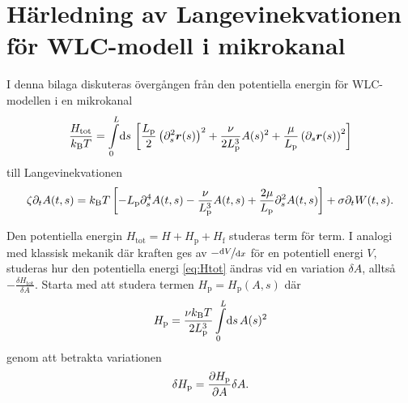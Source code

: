 \chapter{Härledning av Langevinekvationen för WLC-modell i mikrokanal}
\label{A5}

I denna bilaga diskuteras övergången från den potentiella energin för WLC-modellen i en mikrokanal 
\begin{equation}\label{eq:Htot}
    \frac{H_\text{tot}}{\kbT}=\int_{0}^{L}\!\dd{s}\,\left[\frac{L_\text{p}}{2}\left(\partial_{s}^{2}\mathbf{r}(s)\right)^2 + \frac{\nu}{2L_\text{p}^3} A(s)^2 + \frac{\mu}{L_\text{p}}\left(\pd_{s}\mathbf{r}(s)\right)^{2} \right]
\end{equation}
till Langevinekvationen 
\begin{equation}\label{eq:wlclangevin}
    \zeta\partial_tA(t,s) = k_{\text{B}}T\left[-L_\text{p}\partial_s^4A(t,s)-\frac{\nu}{L_\text{p}^3}A(t,s)+\frac{2\mu}{L_\text{p}}\partial_s^2A(t,s) \right]+\sigma\partial_tW(t,s).
\end{equation}

Den potentiella energin $H_\text{tot} = H + H_{\text{p}} + H_{\text{f}}$ studeras term för term. I analogi med klassisk mekanik där kraften ges av $-\nicefrac{\dd{V}}{\dd{x}}$ för en potentiell energi $V$, studeras hur den potentiella energi \eqref{eq:Htot} ändras vid en variation $\delta A$, alltså $-\frac{\delta H_\text{tot}}{\delta A}$. Starta med att studera termen $H_{\text{p}} = H_{\text{p}}(A,s)$ där
\begin{equation}
    H_{\text{p}} = \frac{\nu\kbT}{2L_\text{p}^3}\int_0^L\!\dd{s} A(s)^2
\end{equation}
genom att betrakta variationen 
\begin{equation}
    \delta H_{\text{p}} = \frac{\partial H_{\text{p}}}{\partial A}\delta A.
\end{equation}

